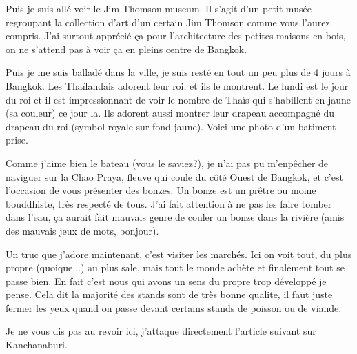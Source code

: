 \begin{multicols}{2}
Puis je suis allé voir le Jim Thomson museum. Il s'agit d'un petit musée regroupant la collection d'art d'un certain Jim Thomson comme vous l'aurez compris. J'ai surtout apprécié ça pour l'architecture des petites maisons en bois, on ne s'attend pas à voir ça en pleins centre de Bangkok.


Puis je me suis balladé dans la ville, je suis resté en tout un peu plus de 4 jours à Bangkok. Les Thaïlandais adorent leur roi, et ils le montrent. Le lundi est le jour du roi et il est impressionnant de voir le nombre de Thaïs qui s'habillent en jaune (sa couleur) ce jour la. Ils adorent aussi montrer leur drapeau accompagné du drapeau du roi (symbol royale sur fond jaune). Voici une photo d'un batiment prise.


Comme j'aime bien le bateau (vous le saviez?), je n'ai pas pu m'enpêcher de naviguer sur la Chao Praya, fleuve qui coule du côté Ouest de Bangkok, et c'est l'occasion de vous présenter des bonzes. Un bonze est un prêtre ou moine bouddhiste, très respecté de tous. J'ai fait attention à ne pas les faire tomber dans l'eau, ça aurait fait mauvais genre de couler un bonze dans la rivière (amis des mauvais jeux de mots, bonjour).


Un truc que j'adore maintenant, c'est visiter les marchés. Ici on voit tout, du plus propre (quoique...) au plus sale, mais tout le monde achète et finalement tout se passe bien. En fait c'est nous qui avons un sens du propre trop développé je pense. Cela dit la majorité des stands sont de très bonne qualite, il faut juste fermer les yeux quand on passe devant certains stands de poisson ou de viande.




Je ne vous dis pas au revoir ici, j'attaque directement l'article suivant sur Kanchanaburi.

\end{multicols}


